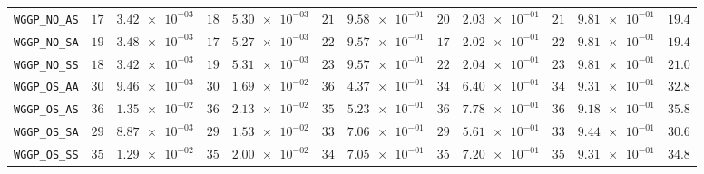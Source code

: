 \begin{xltabular}{\textwidth}{l||cC|cC|cC|cC|cC||c}
	\texttt{WGGP\_NO\_AS} & $ 17$ & $ \num{3.42e-03}$ & $ 18$ & $ \num{5.30e-03}$ & $ 21$ & $ \num{9.58e-01}$ & $ 20$ & $ \num{2.03e-01}$ & $ 21$ & $ \num{9.81e-01}$ & $ 19.4$  \\
	\texttt{WGGP\_NO\_SA} & $ 19$ & $ \num{3.48e-03}$ & $ 17$ & $ \num{5.27e-03}$ & $ 22$ & $ \num{9.57e-01}$ & $ 17$ & $ \num{2.02e-01}$ & $ 22$ & $ \num{9.81e-01}$ & $ 19.4$  \\
	\texttt{WGGP\_NO\_SS} & $ 18$ & $ \num{3.42e-03}$ & $ 19$ & $ \num{5.31e-03}$ & $ 23$ & $ \num{9.57e-01}$ & $ 22$ & $ \num{2.04e-01}$ & $ 23$ & $ \num{9.81e-01}$ & $ 21.0$  \\
	\texttt{WGGP\_OS\_AA} & $ 30$ & $ \num{9.46e-03}$ & $ 30$ & $ \num{1.69e-02}$ & $ 36$ & $ \num{4.37e-01}$ & $ 34$ & $ \num{6.40e-01}$ & $ 34$ & $ \num{9.31e-01}$ & $ 32.8$  \\
	\texttt{WGGP\_OS\_AS} & $ 36$ & $ \num{1.35e-02}$ & $ 36$ & $ \num{2.13e-02}$ & $ 35$ & $ \num{5.23e-01}$ & $ 36$ & $ \num{7.78e-01}$ & $ 36$ & $ \num{9.18e-01}$ & $ 35.8$  \\
	\texttt{WGGP\_OS\_SA} & $ 29$ & $ \num{8.87e-03}$ & $ 29$ & $ \num{1.53e-02}$ & $ 33$ & $ \num{7.06e-01}$ & $ 29$ & $ \num{5.61e-01}$ & $ 33$ & $ \num{9.44e-01}$ & $ 30.6$  \\
	\texttt{WGGP\_OS\_SS} & $ 35$ & $ \num{1.29e-02}$ & $ 35$ & $ \num{2.00e-02}$ & $ 34$ & $ \num{7.05e-01}$ & $ 35$ & $ \num{7.20e-01}$ & $ 35$ & $ \num{9.31e-01}$ & $ 34.8$  \\

\end{xltabular}
